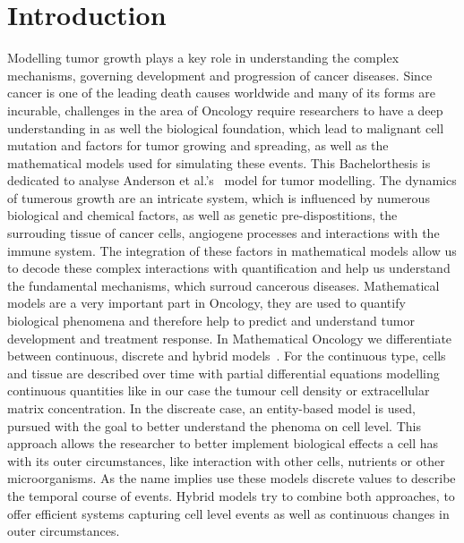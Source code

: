 \section{Introduction}
Modelling tumor growth plays a key role in understanding the complex mechanisms, governing development and progression of cancer diseases. Since cancer is one of the leading death causes worldwide and many of its forms are incurable, challenges in the area of Oncology require researchers to have a deep understanding in as well the biological foundation, which lead to malignant cell mutation and factors for tumor growing and spreading, as well as the mathematical models used for simulating these events. This Bachelorthesis is dedicated to analyse Anderson et al.'s~\cite{anderson_continuous_1998,anderson_mathematical_2000} model for tumor modelling.\newline
The dynamics of tumerous growth are an intricate system, which is influenced by numerous biological and chemical factors, as well as genetic pre-dispostitions, the surrouding tissue of cancer cells, angiogene processes and interactions with the immune system. The integration of these factors in mathematical models allow us to decode these complex interactions with quantification and help us understand the fundamental mechanisms, which surroud cancerous diseases. \newline 
Mathematical models are a very important part in Oncology,  they are used to quantify biological phenomena and therefore help to predict and understand tumor development and treatment response. In Mathematical Oncology we differentiate between continuous, discrete and hybrid models~\cite{BEKISZ2020101198}. For the continuous type, cells and tissue are described over time with partial differential equations modelling continuous quantities like in our case the tumour cell density or extracellular matrix concentration.\newline 
In the discreate case, an entity-based model is used, pursued with the goal to better understand the phenoma on cell level. This approach allows the researcher to better implement biological effects a cell has with its outer circumstances, like interaction with other cells, nutrients or other microorganisms. As the name implies use these models discrete values to describe the temporal course of events.\newline
Hybrid models try to combine both approaches, to offer efficient systems capturing cell level events as well as continuous changes in outer circumstances.\newline 
